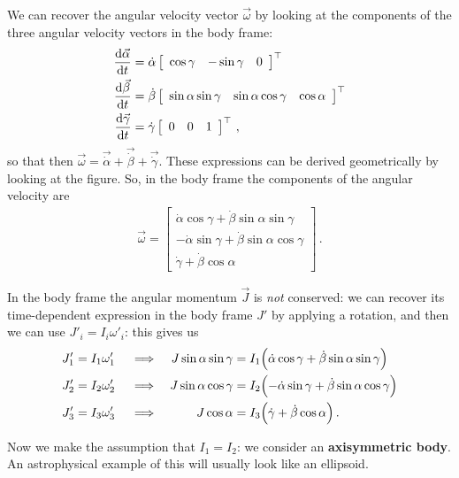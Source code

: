 \documentclass[main.tex]{subfiles}
\begin{document}
We can recover the angular velocity vector \(\vec{\omega}\) by looking at the components of the three angular velocity vectors in the body frame:
%
\begin{align}
\dv{\vec{\alpha}}{t} &= \dot{\alpha} \left[\begin{array}{ccc}
\cos \gamma  &  - \sin \gamma  &  0 
\end{array}\right]^{\top}  \\
\dv{\vec{\beta}}{t} &= \dot{\beta} 
\left[\begin{array}{ccc}
\sin \alpha \sin \gamma  & \sin \alpha \cos \gamma  & \cos \alpha 
\end{array}\right]^{\top} \\
\dv{\vec{\gamma}}{t} &= \dot{\gamma} \left[\begin{array}{ccc}
0 & 0 & 1
\end{array}\right]^{\top}
\,,
\end{align}
%
so that then  \(\vec{\omega} = \vec{\dot{\alpha}} + \vec{\dot{\beta}} + \vec{\dot{\gamma}}\).
These expressions can be derived geometrically by looking at the figure. 
So, in the body frame the components of the angular velocity are 
%
\begin{align}
\vec{\omega} = \left[\begin{array}{c}
\dot{\alpha} \cos \gamma + \dot{\beta} \sin \alpha \sin \gamma  \\ 
- \dot{\alpha} \sin \gamma + \dot{\beta} \sin \alpha \cos \gamma  \\ 
\dot{\gamma} + \dot{\beta}\cos \alpha 
\end{array}\right]
\,.
\end{align}

In the body frame the angular momentum \(\vec{J}\) is \emph{not} conserved: we can recover its time-dependent expression in the body frame \(J'\) by applying a rotation, and then we can use \(J'_i = I_i \omega'_i\): this gives us 
%
\begin{align}
J'_1 &= I_1 \omega_1' &&\implies & J \sin \alpha \sin \gamma &= I_1 \qty(\dot{\alpha} \cos \gamma + \dot{\beta} \sin \alpha \sin \gamma ) \\
J'_2 &= I_2 \omega_2' &&\implies & J \sin \alpha \cos \gamma &= I_2 \qty(- \dot{\alpha} \sin \gamma + \dot{\beta} \sin \alpha \cos \gamma) \\
J'_3 &= I_3 \omega_3' &&\implies & J \cos \alpha  &= I_3 \qty(\dot{\gamma} + \dot{\beta} \cos \alpha ) 
\,.
\end{align}

Now we make the assumption that \(I_1 = I_2 \): we consider an \textbf{axisymmetric body}.
An astrophysical example of this will usually look like an ellipsoid.
\end{document}
